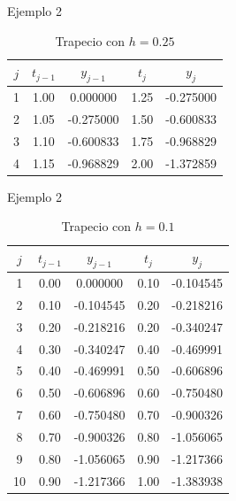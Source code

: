 		\begin{frame}{Ejemplo 2}
			\begin{table}[H]
				\centering
				\begin{tabular}{|| c | c | c | c | c ||}
					\hline
					\hline $j$ &  $t_{j-1}$ & $y_{j-1}$ & $t_j$ & $y_j$ \\
					\hline 1 & 1.00 & 0.000000 & 1.25 & -0.275000 \\
					\hline 2 & 1.05 & -0.275000 & 1.50 & -0.600833 \\
					\hline 3 & 1.10 & -0.600833 & 1.75 & -0.968829 \\
					\hline 4 & 1.15 & -0.968829 & 2.00 & -1.372859 \\
					\hline
					\hline
				\end{tabular}
				\caption{Trapecio con $h=0.25$}
				\label{table:trapecio-ejemplo2.1}
			\end{table}		
		\end{frame}
		
		\begin{frame}{Ejemplo 2}
				\begin{table}[H]
					\centering
					\begin{tabular}{|| c | c | c | c | c ||}
						\hline
						\hline $j$ &  $t_{j-1}$ & $y_{j-1}$ & $t_j$ & $y_j$ \\
						\hline 1 & 0.00 & 0.000000 & 0.10 & -0.104545 \\
						\hline 2 & 0.10 & -0.104545 & 0.20 & -0.218216 \\
						\hline 3 & 0.20 & -0.218216 & 0.20 & -0.340247 \\
						\hline 4 & 0.30 & -0.340247 & 0.40 & -0.469991 \\
						\hline 5 & 0.40 & -0.469991 & 0.50 & -0.606896 \\
						\hline 6 & 0.50 & -0.606896 & 0.60 & -0.750480 \\
						\hline 7 & 0.60 & -0.750480 & 0.70 & -0.900326 \\
						\hline 8 & 0.70 & -0.900326 & 0.80 & -1.056065 \\
						\hline 9 & 0.80 & -1.056065 & 0.90 & -1.217366 \\
						\hline 10 & 0.90 & -1.217366 & 1.00 & -1.383938 \\
						\hline
						\hline
					\end{tabular}
					\caption{Trapecio con $h=0.1$}
				\end{table}
		\end{frame}
					
